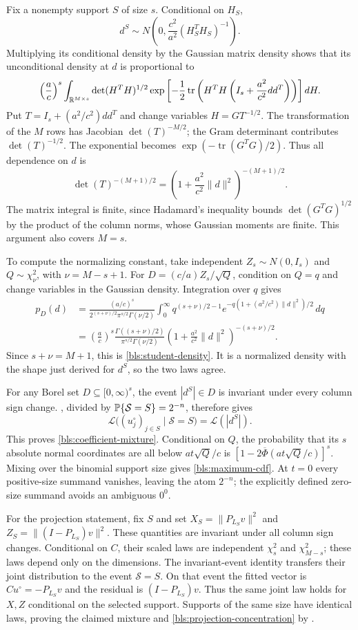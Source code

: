 Fix a nonempty support $S$ of size $s$.  Conditional on $H_S$,
\[
 d^S\sim N\left(0,\frac{c^2}{a^2}(H_S^TH_S)^{-1}\right).
\]
Multiplying its conditional density by the Gaussian matrix density shows
that its unconditional density at $d$ is proportional to
\[
 \left(\frac ac\right)^s
 \int_{\mathbb{R}^{M\times s}}\det(H^TH)^{1/2}
 \exp\left[-\frac12\operatorname{tr}
       \left(H^TH\left(I_s+\frac{a^2}{c^2}dd^T\right)\right)\right]dH.
\]
Put $T=I_s+(a^2/c^2)dd^T$ and change variables $H=GT^{-1/2}$.
The transformation of the $M$ rows has Jacobian $\det(T)^{-M/2}$;
the Gram determinant contributes $\det(T)^{-1/2}$.  The exponential
becomes $\exp(-\operatorname{tr}(G^TG)/2)$.  Thus all dependence on $d$
is
\[
 \det(T)^{-(M+1)/2}
 =\left(1+\frac{a^2}{c^2}\|d\|^2\right)^{-(M+1)/2}.
\]
The matrix integral is finite, since Hadamard's inequality bounds
$\det(G^TG)^{1/2}$ by the product of the column norms, whose Gaussian
moments are finite.  This argument also covers $M=s$.

To compute the normalizing constant, take independent
$Z_s\sim N(0,I_s)$ and $Q\sim\chi^2_\nu$, with $\nu=M-s+1$.
For $D=(c/a)Z_s/\sqrt Q$, condition on $Q=q$ and change variables in the
Gaussian density.  Integration over $q$ gives
\begin{align*}
 p_D(d)
 &=\frac{(a/c)^s}{2^{(s+\nu)/2}\pi^{s/2}\Gamma(\nu/2)}
   \int_0^\infty q^{(s+\nu)/2-1}
   e^{-q(1+(a^2/c^2)\|d\|^2)/2}\,dq\\
 &=\left(\frac ac\right)^s
 \frac{\Gamma((s+\nu)/2)}{\pi^{s/2}\Gamma(\nu/2)}
 \left(1+\frac{a^2}{c^2}\|d\|^2\right)^{-(s+\nu)/2}.
\end{align*}
Since $s+\nu=M+1$, this is \eqref{bls:student-density}.  It is a
normalized density with the shape just derived for $d^S$, so the two laws
agree.

For any Borel set $D\subseteq[0,\infty)^s$, the event
$|d^S|\in D$ is invariant under every column sign change.
, divided by $\mathbb{P}\{\mathcal S=S\}=2^{-n}$,
therefore gives
\[
 \mathcal L\bigl((u_j^\circ)_{j\in S}\mid\mathcal S=S\bigr)
 =\mathcal L(|d^S|).
\]
This proves \eqref{bls:coefficient-mixture}.  Conditional on $Q$,
the probability that its $s$ absolute normal coordinates are all below
$at\sqrt Q/c$ is
$[1-2\overline\Phi(at\sqrt Q/c)]^s$.
Mixing over the binomial support size gives \eqref{bls:maximum-cdf}.
At $t=0$ every positive-size summand vanishes, leaving the atom $2^{-n}$;
the explicitly defined zero-size summand avoids an ambiguous $0^0$.

For the projection statement, fix $S$ and set
$X_S=\|P_{L_S}v\|^2$ and $Z_S=\|(I-P_{L_S})v\|^2$.
These quantities are invariant under all column sign changes.  Conditional
on $C$, their scaled laws are independent $\chi^2_s$ and
$\chi^2_{M-s}$; these laws depend only on the dimensions.
The invariant-event identity transfers their joint distribution to the
event $\mathcal S=S$.  On that event the fitted vector is
$Cu^\circ=-P_{L_S}v$ and the residual is $(I-P_{L_S})v$.
Thus the same joint law holds for $X,Z$ conditional on the selected
support.  Supports of the same size have identical laws, proving the
claimed mixture and \eqref{bls:projection-concentration} by
.

